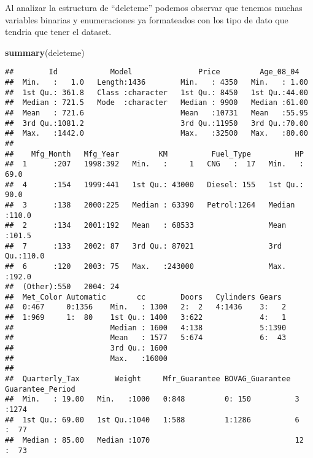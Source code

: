 \documentclass[
]{article}
\newenvironment{Shaded}{\begin{snugshade}}{\end{snugshade}}
\newcommand{\KeywordTok}[1]{\textcolor[rgb]{0.13,0.29,0.53}{\textbf{#1}}}
\newcommand{\NormalTok}[1]{#1}
\begin{document}
Al analizar la estructura de ``deleteme'' podemos observar que tenemos
muchas variables binarias y enumeraciones ya formateados con los tipo de
dato que tendria que tener el dataset.

\begin{Shaded}
\begin{Highlighting}[]
\KeywordTok{summary}\NormalTok{(deleteme)}
\end{Highlighting}
\end{Shaded}

\begin{verbatim}
##        Id            Model               Price         Age_08_04    
##  Min.   :   1.0   Length:1436        Min.   : 4350   Min.   : 1.00  
##  1st Qu.: 361.8   Class :character   1st Qu.: 8450   1st Qu.:44.00  
##  Median : 721.5   Mode  :character   Median : 9900   Median :61.00  
##  Mean   : 721.6                      Mean   :10731   Mean   :55.95  
##  3rd Qu.:1081.2                      3rd Qu.:11950   3rd Qu.:70.00  
##  Max.   :1442.0                      Max.   :32500   Max.   :80.00  
##                                                                     
##    Mfg_Month   Mfg_Year         KM          Fuel_Type          HP       
##  1      :207   1998:392   Min.   :     1   CNG   :  17   Min.   : 69.0  
##  4      :154   1999:441   1st Qu.: 43000   Diesel: 155   1st Qu.: 90.0  
##  3      :138   2000:225   Median : 63390   Petrol:1264   Median :110.0  
##  2      :134   2001:192   Mean   : 68533                 Mean   :101.5  
##  7      :133   2002: 87   3rd Qu.: 87021                 3rd Qu.:110.0  
##  6      :120   2003: 75   Max.   :243000                 Max.   :192.0  
##  (Other):550   2004: 24                                                 
##  Met_Color Automatic       cc        Doors   Cylinders Gears   
##  0:467     0:1356    Min.   : 1300   2:  2   4:1436    3:   2  
##  1:969     1:  80    1st Qu.: 1400   3:622             4:   1  
##                      Median : 1600   4:138             5:1390  
##                      Mean   : 1577   5:674             6:  43  
##                      3rd Qu.: 1600                             
##                      Max.   :16000                             
##                                                                
##  Quarterly_Tax        Weight     Mfr_Guarantee BOVAG_Guarantee Guarantee_Period
##  Min.   : 19.00   Min.   :1000   0:848         0: 150          3      :1274    
##  1st Qu.: 69.00   1st Qu.:1040   1:588         1:1286          6      :  77    
##  Median : 85.00   Median :1070                                 12     :  73    

\end{verbatim}
\end{document}
